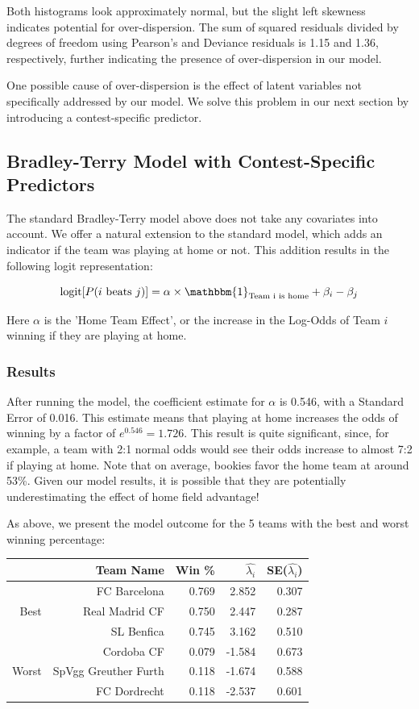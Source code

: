 \documentclass{article}
\begin{document}
Both histograms look approximately normal, but the slight left skewness indicates potential for over-dispersion. The sum of squared residuals divided by degrees of freedom using Pearson's and Deviance residuals is 1.15 and 1.36, respectively, further indicating the presence of over-dispersion in our model.

One possible cause of over-dispersion is the effect of latent variables not specifically addressed by our model. We solve this problem in our next section by introducing a contest-specific predictor.

\subsection{Bradley-Terry Model with Contest-Specific Predictors}

The standard Bradley-Terry model above does not take any covariates into account. We offer a natural extension to the standard model, which adds an indicator if the team was playing at home or not. This addition results in the following logit representation:

$$\text{logit}[P(i \text{ beats } j)] = \alpha \times \mathbbm{1}_{\text{Team i is home}} + \beta_i - \beta_j$$

Here $\alpha$ is the 'Home Team Effect', or the increase in the Log-Odds of Team $i$ winning if they are playing at home.

\subsubsection{Results}

After running the model, the coefficient estimate for $\alpha$ is 0.546, with a Standard Error of 0.016. This estimate means that playing at home increases the odds of winning by a factor of $e^{0.546} = 1.726$. This result is quite significant, since, for example, a team with 2:1 normal odds would see their odds increase to almost 7:2 if playing at home. Note that on average, bookies favor the home team at around 53\%. Given our model results, it is possible that they are potentially underestimating the effect of home field advantage!

As above, we present the model outcome for the 5 teams with the best and worst winning percentage:

\begin{table}[H]
\centering
\begin{tabular}{|r|rrrr|}
  \hline
 & Team Name & Win \% & $\hat{\lambda_i}$ & SE($\hat{\lambda_i}$) \\ 
  \hline
   &  FC Barcelona & 0.769 & 2.852 & 0.307 \\ 
 Best  &  Real Madrid CF & 0.750 & 2.447 & 0.287 \\ 
   &  SL Benfica & 0.745 & 3.162 & 0.510 \\ \cline{1-5}
   &  Cordoba CF & 0.079 & -1.584 & 0.673 \\ 
Worst   &  SpVgg Greuther Furth & 0.118 & -1.674  & 0.588 \\ 
   & FC Dordrecht & 0.118 & -2.537 & 0.601 \\
   \hline
\end{tabular}
\end{table}
\end{document}
